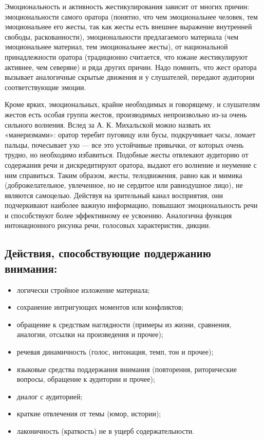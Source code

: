 Эмоциональность и активность жестикулирования зависит от многих причин: эмоциональности самого оратора (понятно, что чем эмоциональнее человек, тем эмоциональнее его жесты, так как жесты есть внешнее выражение внутренней свободы, раскованности), эмоциональности предлагаемого материала (чем эмоциональнее материал, тем эмоциональнее жесты), от национальной принадлежности оратора (традиционно считается, что южане жестикулируют активнее, чем северяне) и ряда других причин. 
Надо помнить, что жест оратора вызывает аналогичные скрытые движения и у слушателей, передают аудитории соответствующие эмоции. 

Кроме ярких, эмоциональных, крайне необходимых и говорящему, и слушателям жестов есть особая группа жестов, производимых непроизвольно из-за очень сильного волнения. Вслед за А. К. Михальской можно назвать их «манеризмами»: оратор теребит пуговицу или бусы, подкручивает часы, ломает пальцы, почесывает ухо — все это устойчивые привычки, от которых очень трудно, но необходимо избавиться. 
Подобные жесты отвлекают аудиторию от содержания речи и дискредитируют оратора, выдают его волнение и неумение с ним справиться. 
Таким образом, жесты, телодвижения, равно как и мимика (доброжелательное, увлеченное, но не сердитое или равнодушное лицо), не являются самоцелью. 
Действуя на зрительный канал восприятия, они подчеркивают наиболее важную информацию, повышают эмоциональность речи и способствуют более эффективному ее усвоению. 
Аналогична функция интонационного рисунка речи, голосовых характеристик, дикции.
\subsection*{Действия, способствующие поддержанию внимания:}
\begin{itemize}[noitemsep] 
\item логически стройное изложение материала;
\item сохранение интригующих моментов или конфликтов;
\item обращение к средствам наглядности (примеры из жизни, сравнения, аналогии, отсылки на произведения и прочее);
\item речевая динамичность (голос, интонация, темп, тон и прочее);
\item языковые средства поддержания внимания (повторения, риторические вопросы, обращение к аудитории и прочее);
\item диалог с аудиторией;
\item краткие отвлечения от темы (юмор, истории);
\item лаконичность (краткость) не в ущерб содержательности.
\end{itemize}

